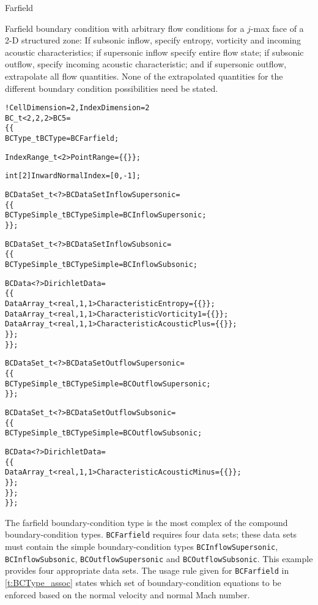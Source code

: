 \begin{example}{Farfield}
\label{ex:bc5}

Farfield boundary condition with arbitrary flow conditions for a $j$-max
face of a 2-D structured zone: If subsonic inflow, specify entropy,
vorticity and incoming acoustic characteristics; if supersonic inflow
specify entire flow state; if subsonic outflow, specify incoming
acoustic characteristic; and if supersonic outflow, extrapolate all
flow quantities.
None of the extrapolated quantities for the different boundary condition
possibilities need be stated.
\begin{alltt}
  !  CellDimension = 2, IndexDimension = 2
  BC\_t<2,2,2> BC5 =
    \{\{
    BCType\_t BCType = BCFarfield ;

    IndexRange\_t<2> PointRange = \{\{ \}\} ;

    int[2] InwardNormalIndex = [0,-1] ;

    BCDataSet\_t<?> BCDataSetInflowSupersonic =
      \{\{
      BCTypeSimple\_t BCTypeSimple = BCInflowSupersonic ;
      \}\} ;

    BCDataSet\_t<?> BCDataSetInflowSubsonic =
      \{\{
      BCTypeSimple\_t BCTypeSimple = BCInflowSubsonic ;

      BCData<?> DirichletData = 
        \{\{
        DataArray\_t<real, 1, 1> CharacteristicEntropy      = \{\{ \}\} ;
        DataArray\_t<real, 1, 1> CharacteristicVorticity1   = \{\{ \}\} ;
        DataArray\_t<real, 1, 1> CharacteristicAcousticPlus = \{\{ \}\} ;
        \}\} ;
      \}\} ;

    BCDataSet\_t<?> BCDataSetOutflowSupersonic =
      \{\{
      BCTypeSimple\_t BCTypeSimple = BCOutflowSupersonic ;
      \}\} ;

    BCDataSet\_t<?> BCDataSetOutflowSubsonic =
      \{\{
      BCTypeSimple\_t BCTypeSimple = BCOutflowSubsonic ;

      BCData<?> DirichletData = 
        \{\{
        DataArray\_t<real, 1, 1> CharacteristicAcousticMinus = \{\{ \}\} ;
        \}\} ;
      \}\} ;
    \}\} ;
\end{alltt}
The farfield boundary-condition type is the most complex of the compound
boundary-condition types.
\texttt{BCFarfield} requires four data sets; these data sets must
contain the simple boundary-condition types \texttt{BCInflowSupersonic},
\texttt{BCInflowSubsonic}, \texttt{BCOutflowSupersonic} and
\texttt{BCOutflowSubsonic}.
This example provides four appropriate data sets.
The usage rule given for \texttt{BCFarfield} in \autoref{t:BCType_assoc}
states which set of boundary-condition equations to be enforced based on
the normal velocity and normal Mach number.


\end{example}
